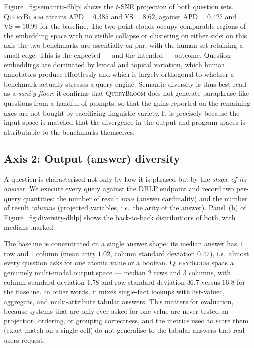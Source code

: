 Figure~\ref{fig:semantic-dblp} shows the $t$-SNE projection of both question sets.
\textsc{QueryBloom} attains $\mathrm{APD}=0.385$ and $\mathrm{VS}=8.62$, against
$\mathrm{APD}=0.423$ and $\mathrm{VS}=10.99$ for the baseline. The two point clouds occupy
comparable regions of the embedding space with no visible collapse or clustering on either
side: on this axis the two benchmarks are essentially on par, with the human set retaining a
small edge. This is the expected --- and the intended --- outcome. Question embeddings are
dominated by lexical and topical variation, which human annotators produce effortlessly and
which is largely orthogonal to whether a benchmark actually stresses a query engine.
Semantic diversity is thus best read as a \emph{sanity floor}: it confirms that
\textsc{QueryBloom} does not generate paraphrase-like questions from a handful of prompts,
so that the gains reported on the remaining axes are not bought by sacrificing linguistic
variety. It is precisely because the input space is matched that the divergence in the
output and program spaces is attributable to the benchmarks themselves.

\subsection{Axis 2: Output (answer) diversity}

A question is characterised not only by how it is phrased but by the \emph{shape of its
answer}. We execute every query against the DBLP endpoint and record two per-query
quantities: the number of result \emph{rows} (answer cardinality) and the number of result
\emph{columns} (projected variables, i.e.\ the arity of the answer). Panel~(b) of
Figure~\ref{fig:diversity-dblp} shows the back-to-back distributions of both, with medians
marked.

The baseline is concentrated on a single answer shape: its median answer has $1$ row and
$1$ column (mean arity $1.02$, column standard deviation $0.47$), i.e.\ almost every
question asks for one atomic value or a boolean. \textsc{QueryBloom} spans a genuinely
multi-modal output space --- median $2$ rows and $3$ columns, with column standard deviation
$1.78$ and row standard deviation $36.7$ versus $16.8$ for the baseline. In other words, it
mixes single-fact lookups with list-valued, aggregate, and multi-attribute tabular answers.
This matters for evaluation, because systems that are only ever asked for one value are
never tested on projection, ordering, or grouping correctness, and the metrics used to score
them (exact match on a single cell) do not generalise to the tabular answers that real users
request.

